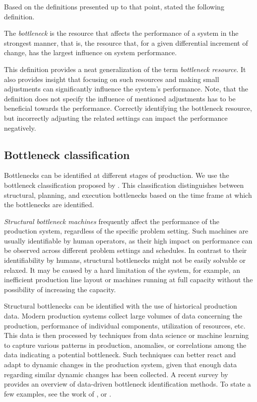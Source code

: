 Based on the definitions presented up to that point,
\citet{Betterton2012} stated the following definition.

\begin{defn} \label{def:bottleneck-general}
    The \emph{bottleneck} is the resource that affects the performance of a system in the strongest manner, that is,
    the resource that, for a given differential increment of change, has the largest influence on system performance.
\end{defn}

This definition provides a neat generalization of the term \emph{bottleneck resource}.
It also provides insight that focusing on such resources and making small adjustments
can significantly influence the system's performance.
Note, that the definition does not specify the influence of mentioned adjustments has to be beneficial towards the performance.
Correctly identifying the bottleneck resource, but incorrectly adjusting the related settings can impact the performance negatively.

\subsection{Bottleneck classification} \label{subsec:related-works/bottlenecks-in-scheduling/bottleneck-classification}

Bottlenecks can be identified at different stages of production.
We use the bottleneck classification proposed by \citet{Wang2016}.
This classification distinguishes between structural, planning, and execution bottlenecks
based on the time frame at which the bottlenecks are identified.

\emph{Structural bottleneck machines} frequently affect the performance of the production system,
regardless of the specific problem setting.
Such machines are usually identifiable by human operators,
as their high impact on performance can be observed across different problem settings and schedules.
In contrast to their identifiability by humans, structural bottlenecks might not be easily solvable or relaxed.
It may be caused by a hard limitation of the system,
for example, an inefficient production line layout or
machines running at full capacity without the possibility of increasing the capacity.

Structural bottlenecks can be identified with the use of historical production data.
Modern production systems collect large volumes of data concerning the production,
performance of individual components, utilization of resources, etc.
This data is then processed by techniques from data science or machine learning
to capture various patterns in production, anomalies, or correlations among the data
indicating a potential bottleneck.
Such techniques can better react and adapt to dynamic changes in the production system,
given that enough data regarding similar dynamic changes has been collected.
A recent survey by \citet{Subramaniyan2021} provides an overview of data-driven bottleneck identification methods.
To state a few examples, see the work of \citet{Subramaniyan2016}, \citet{Roh2018} or \citet{Li2009}.

